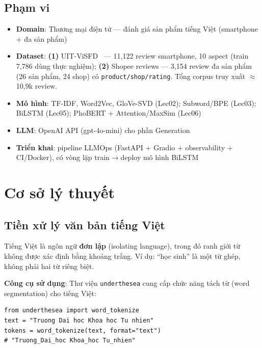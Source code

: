\documentclass[12pt,a4paper]{article}
\begin{document}
\subsection{Phạm vi}

\begin{itemize}[leftmargin=2cm]
  \item \textbf{Domain}: Thương mại điện tử --- đánh giá sản phẩm tiếng Việt (smartphone + đa sản phẩm)
  \item \textbf{Dataset}: \textbf{(1)} UIT-ViSFD~\cite{luc2021visfd} --- 11,122 review smartphone, 10 aspect (train 7,786 dùng thực nghiệm); \textbf{(2)} Shopee reviews --- 3,154 review đa sản phẩm (26 sản phẩm, 24 shop) có \texttt{product/shop/rating}. Tổng corpus truy xuất $\approx$ 10,9k review.
  \item \textbf{Mô hình}: TF-IDF, Word2Vec, GloVe-SVD (Lec02); Subword/BPE (Lec03); BiLSTM (Lec05); PhoBERT + Attention/MaxSim (Lec06)
  \item \textbf{LLM}: OpenAI API (gpt-4o-mini) cho phần Generation
  \item \textbf{Triển khai}: pipeline LLMOps (FastAPI + Gradio + observability + CI/Docker), có vòng lặp train$\to$deploy mô hình BiLSTM
\end{itemize}

\section{Cơ sở lý thuyết}

\subsection{Tiền xử lý văn bản tiếng Việt}

Tiếng Việt là ngôn ngữ \textbf{đơn lập} (isolating language), trong đó ranh giới từ không được xác định bằng khoảng trắng. Ví dụ: ``học sinh'' là một từ ghép, không phải hai từ riêng biệt.

\textbf{Công cụ sử dụng}: Thư viện \texttt{underthesea} cung cấp chức năng tách từ (word segmentation) cho tiếng Việt:

\begin{lstlisting}[caption={Tách từ tiếng Việt}]
from underthesea import word_tokenize
text = "Truong Dai hoc Khoa hoc Tu nhien"
tokens = word_tokenize(text, format="text")
# "Truong_Dai_hoc Khoa_hoc Tu_nhien"
\end{lstlisting}
\end{document}
